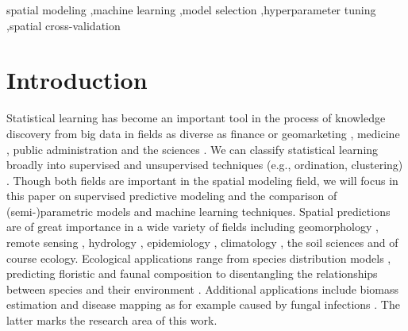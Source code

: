 \documentclass[review]{elsarticle}
\begin{document}
\begin{frontmatter}
	\begin{keyword}
		spatial modeling \sep machine learning \sep model selection \sep hyperparameter tuning \sep spatial cross-validation
	\end{keyword}

\end{frontmatter}

\linenumbers

\begin{acronym}[AUROC]

\end{acronym}

\section{Introduction}
\label{sec:intro}
Statistical learning has become an important tool in the process of knowledge discovery from big data in fields as diverse as finance or geomarketing \citep{Heaton2016, Schernthanner2017}, medicine \citep{Leung2016}, public administration \citep{Maenner2016} and the sciences \citep{Garofalo2016}.
We can classify statistical learning broadly into supervised and unsupervised techniques (e.g., ordination, clustering) \citep{James2013}.
Though both fields are important in the spatial modeling field, we will focus in this paper on supervised predictive modeling and the comparison of (semi-)parametric models and machine learning techniques.
Spatial predictions are of great importance in a wide variety of fields including geomorphology \citep{brenning_landslide_2015}, remote sensing \citep{Stelmaszczuk2017}, hydrology \citep{Naghibi2016}, epidemiology \citep{Alder2017}, climatology \citep{Voyant2017}, the soil sciences \citep{Hengl2017} and of course ecology.
Ecological applications range from species distribution models \citep{Halvorsen2016, Quillfeldt2017, Wieland2017}, predicting floristic \citep{muenchow_coupling_2013} and faunal composition to disentangling the relationships between species and their environment \citep{muenchow_soil_2013}.
Additional applications include biomass estimation \citep{Fassnacht2014} and disease mapping as for example caused by fungal infections \citep{Iturritxa2014}.
The latter marks the research area of this work.
\end{document}

